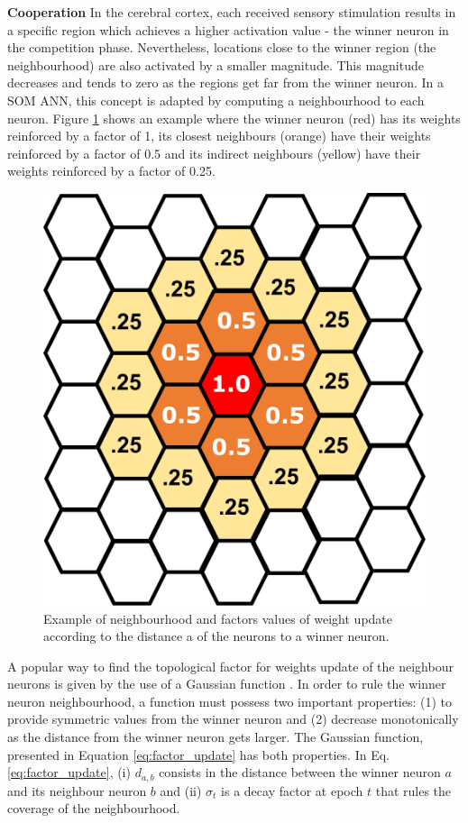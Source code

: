 \noindent\textbf{Cooperation} In the cerebral cortex, each received sensory stimulation results in a specific region which achieves a higher activation value - the winner neuron in the competition phase. Nevertheless, locations close to the winner region (the neighbourhood) are also activated by a smaller magnitude. This magnitude decreases and tends to zero as the regions get far from the winner neuron. In a SOM ANN, this concept is adapted by computing a neighbourhood to each neuron. Figure \ref{fig:cooperation} shows an example where the winner neuron (red) has its weights reinforced by a factor of 1, its closest neighbours (orange) have their weights reinforced by a factor of 0.5 and its indirect neighbours (yellow) have their weights reinforced by a factor of 0.25. 

\begin{figure}[h]
\centering
\includegraphics[scale=0.08]{"Part 3 - Learning Systems/Unsupervised Learning/Self-Organizing Maps/figs/cooperation.pdf"}
\caption{Example of neighbourhood and factors values of weight update according to the distance a of the neurons to a winner neuron.}
\label{fig:cooperation}
\end{figure}

A popular way to find the topological factor for weights update of the neighbour neurons is given by the use of a Gaussian function \cite{haykin:2009}. In order to rule the winner neuron neighbourhood, a function must possess two important properties: (1) to provide symmetric values from the winner neuron and (2) decrease monotonically as the distance from the winner neuron gets larger. The Gaussian function, presented in Equation \ref{eq:factor_update} has both properties. In Eq. \ref{eq:factor_update}, (i) $d_{a,b}$ consists in the distance between the winner neuron $a$ and its neighbour neuron $b$ and (ii) $\sigma_{t}$ is a decay factor at epoch $t$ that rules the coverage of the neighbourhood.  

